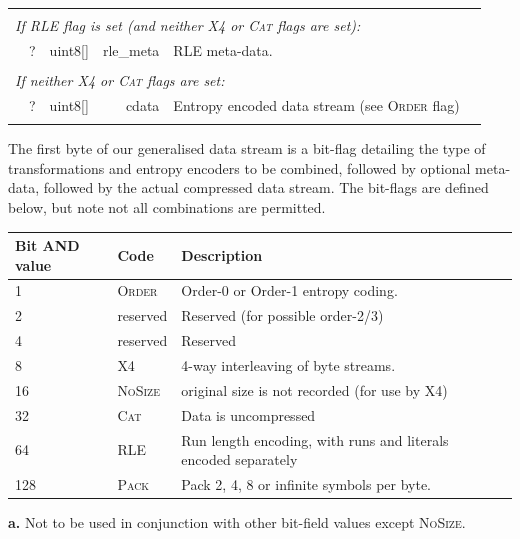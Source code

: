 \documentclass[a4paper]{article}
\begin{document}
\begin{table}[h]
\begin{tabular}{|r|r|r|r|p{9cm}|l|}
\multicolumn{6}{|l|}{}\\[-0.7em]
\multicolumn{6}{|l|}{\textit{If \textsc{RLE} flag is set (and neither \textsc{X4} or \textsc{Cat} flags are set):} } \\
\cline{2-5}
& ? & uint8[] & rle\_meta & RLE meta-data.\\
\cline{2-5}

\multicolumn{6}{|l|}{}\\[-0.7em]
\multicolumn{6}{|l|}{\textit{If neither \textsc{X4} or \textsc{Cat} flags are set:} } \\
\cline{2-5}
& ? & uint8[] & cdata & Entropy encoded data stream (see \textsc{Order} flag) & \\
\cline{2-5}
\multicolumn{6}{|l|}{}\\
\hline
\end{tabular}
\end{table}

The first byte of our generalised data stream is a bit-flag detailing the type of transformations and entropy encoders to be combined, followed by optional meta-data, followed by the actual compressed data stream.
The bit-flags are defined below, but note not all combinations are permitted.

\begin{threeparttable}[t]
\begin{tabular}{llll}
\hline
\textbf{Bit AND value} & \textbf{Code} & \textbf{Description} \\
\hline
1 & \textsc{Order} & Order-0 or Order-1 entropy coding. \\
2 & reserved & Reserved (for possible order-2/3)\\
4 & reserved & Reserved \\
8 & \textsc{X4}\tnote{\textbf{a}} & 4-way interleaving of byte streams.\\
16 & \textsc{NoSize} & original size is not recorded (for use by X4)\\
32 & \textsc{Cat} & Data is uncompressed\\
64 & \textsc{RLE} & Run length encoding, with runs and literals encoded separately\\
128 & \textsc{Pack} & Pack 2, 4, 8 or infinite symbols per byte.\\
\hline
\end{tabular}
\begin{tablenotes}
\item{\textbf{a.}} Not to be used in conjunction with other bit-field
  values except \textsc{NoSize}.
\end{tablenotes}
\end{threeparttable}
\end{document}
